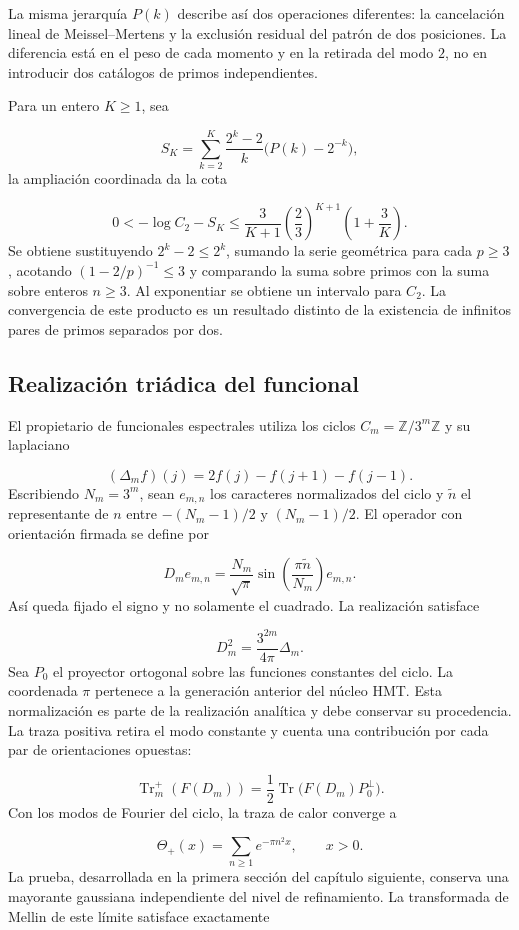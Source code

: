 La misma jerarquía $P(k)$ describe así dos operaciones diferentes: la cancelación lineal de Meissel–Mertens y la exclusión residual del patrón de dos posiciones. La diferencia está en el peso de cada momento y en la retirada del modo $2$, no en introducir dos catálogos de primos independientes.

Para un entero \(K\ge1\), sea

\[
S_K=\sum_{k=2}^K\frac{2^k-2}{k}\bigl(P(k)-2^{-k}\bigr),
\]
la ampliación coordinada da la cota

\[
0<-\log C_2-S_K
\le\frac3{K+1}\left(\frac23\right)^{K+1}\left(1+\frac3K\right).
\]
Se obtiene sustituyendo $2^k-2\le2^k$, sumando la serie geométrica para cada $p\ge3$, acotando $(1-2/p)^{-1}\le3$ y comparando la suma sobre primos con la suma sobre enteros $n\ge3$. Al exponentiar se obtiene un intervalo para $C_2$. La convergencia de este producto es un resultado distinto de la existencia de infinitos pares de primos separados por dos.

\subsection{Realización triádica del funcional}
El propietario de funcionales espectrales utiliza los ciclos $C_m=\mathbb Z/3^m\mathbb Z$ y su laplaciano

\[
(\Delta_mf)(j)=2f(j)-f(j+1)-f(j-1).
\]
Escribiendo \(N_m=3^m\), sean \(e_{m,n}\) los caracteres normalizados del ciclo y \(\widetilde n\) el representante de \(n\) entre \(-(N_m-1)/2\) y \((N_m-1)/2\). El operador con orientación firmada se define por

\[
D_m e_{m,n}=\frac{N_m}{\sqrt{\pi}}
\sin\left(\frac{\pi\widetilde n}{N_m}\right)e_{m,n}.
\]
Así queda fijado el signo y no solamente el cuadrado. La realización satisface

\[
D_m^2=\frac{3^{2m}}{4\pi}\Delta_m.
\]
Sea \(P_0\) el proyector ortogonal sobre las funciones constantes del ciclo. La coordenada $\pi$ pertenece a la generación anterior del núcleo HMT. Esta normalización es parte de la realización analítica y debe conservar su procedencia. La traza positiva retira el modo constante y cuenta una contribución por cada par de orientaciones opuestas:

\[
\operatorname{Tr}_m^+(F(D_m))
=\frac12\operatorname{Tr}\bigl(F(D_m)P_0^\perp\bigr).
\]
Con los modos de Fourier del ciclo, la traza de calor converge a

\[
\Theta_+(x)=\sum_{n\ge1}e^{-\pi n^2x},\qquad x>0.
\]
La prueba, desarrollada en la primera sección del capítulo siguiente, conserva una mayorante gaussiana independiente del nivel de refinamiento. La transformada de Mellin de este límite satisface exactamente


